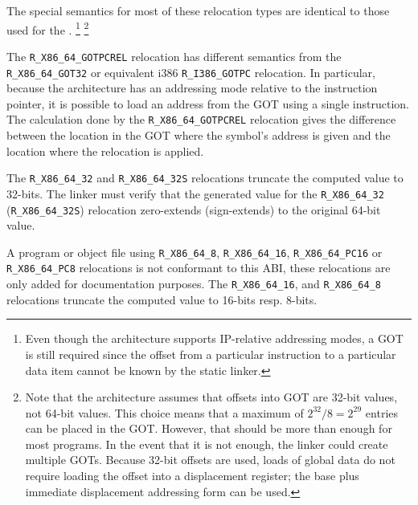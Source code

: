 The special semantics for most of these relocation types are identical
to those used for the \intelabi.  \footnote{Even though
  the \xARCH architecture supports IP-relative addressing modes, a GOT
  is still required since the offset from a particular instruction to
  a particular data item cannot be known by the static linker.}
\footnote{Note that the \xARCH architecture assumes that offsets into
  GOT are 32-bit values, not 64-bit values.  This choice means that a
  maximum of $2^{32}/8 = 2^{29}$ entries can be placed in the GOT.
  However, that should be more than enough for most programs.  In the
  event that it is not enough, the linker could create multiple GOTs.
  Because 32-bit offsets are used, loads of global data do not require
  loading the offset into a displacement register; the base plus
  immediate displacement addressing form can be used.}

\begin{sloppypar}
The \texttt{R_X86_64_GOTPCREL} relocation has different semantics from the
\texttt{R_X86_64_GOT32} or equivalent i386 \texttt{R_I386_GOTPC} relocation.
In particular, because the \xARCH architecture has an addressing mode relative
to the instruction pointer, it is possible to load an address from the GOT
using a single instruction.  The calculation done by the
\texttt{R_X86_64_GOTPCREL} relocation gives the difference between the location
in the GOT where the symbol's address is given and the location where the
relocation is applied.
\end{sloppypar}

\begin{sloppypar}
The \texttt{R_X86_64_32} and \texttt{R_X86_64_32S} relocations truncate
the computed value to 32-bits.  The linker must verify that the
generated value for the \texttt{R_X86_64_32} (\texttt{R_X86_64_32S})
relocation zero-extends (sign-extends) to the original 64-bit value.
\end{sloppypar}

\begin{sloppypar}
A program or object file using \texttt{R_X86_64_8},
\texttt{R_X86_64_16}, \texttt{R_X86_64_PC16} or \texttt{R_X86_64_PC8}
relocations is not conformant to this ABI, these relocations are only
added for documentation purposes.  The \texttt{R_X86_64_16}, and
\texttt{R_X86_64_8} relocations truncate the computed value to 16-bits
resp. 8-bits.
\end{sloppypar}

